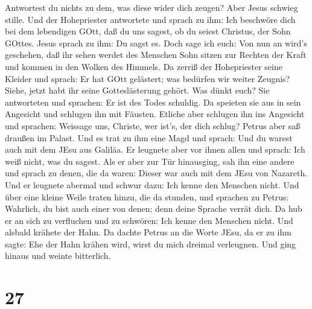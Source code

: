 Antwortest du nichts zu dem, was diese wider dich zeugen? 
Aber Jesus schwieg stille. Und der Hohepriester antwortete und sprach zu
ihm: Ich beschwöre dich bei dem lebendigen GOtt, daß du uns sagest, ob
du seiest Christus, der Sohn GOttes.  Jesus sprach zu ihm:
Du sagst es. Doch sage ich euch: Von nun an wird's geschehen, daß ihr
sehen werdet des Menschen Sohn sitzen zur Rechten der Kraft und kommen
in den Wolken des Himmels.  Da zerriß der Hohepriester
seine Kleider und sprach: Er hat GOtt gelästert; was bedürfen wir weiter
Zeugnis? Siehe, jetzt habt ihr seine Gotteslästerung gehört.
 Was dünkt euch? Sie antworteten und sprachen: Er ist des
Todes schuldig.  Da speieten sie aus in sein Angesicht und
schlugen ihn mit Fäusten. Etliche aber schlugen ihn ins Angesicht
 und sprachen: Weissage uns, Christe, wer ist's, der dich
schlug?  Petrus aber saß draußen im Palast. Und es trat zu
ihm eine Magd und sprach: Und du warest auch mit dem JEsu aus Galiläa.
 Er leugnete aber vor ihnen allen und sprach: Ich weiß
nicht, was du sagest.  Als er aber zur Tür hinausging, sah
ihn eine andere und sprach zu denen, die da waren: Dieser war auch mit
dem JEsu von Nazareth.  Und er leugnete abermal und schwur
dazu: Ich kenne den Menschen nicht.  Und über eine kleine
Weile traten hinzu, die da stunden, und sprachen zu Petrus: Wahrlich, du
bist auch einer von denen; denn deine Sprache verrät dich. 
Da hub er an sich zu verfluchen und zu schwören: Ich kenne den Menschen
nicht. Und alsbald krähete der Hahn.  Da dachte Petrus an
die Worte JEsu, da er zu ihm sagte: Ehe der Hahn krähen wird, wirst du
mich dreimal verleugnen. Und ging hinaus und weinte bitterlich.

\hypertarget{section-26}{%
\section{27}\label{section-26}}

